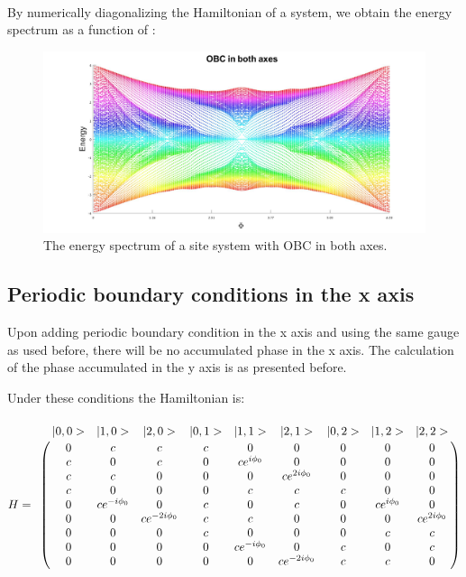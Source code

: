 \documentclass[11pt,fleqn]{article}
\begin{document}
\paragraph{}
By numerically diagonalizing the Hamiltonian of a \endmath \space system, we obtain the energy spectrum as a function of \math{\Phi} \endmath:




\begin{figure}[htp!]
\centerline
    {\includegraphics[scale=0.25]{OBCinbothaxes15sites.jpg}}
    \caption{The energy spectrum of a \endmath\space site system with OBC in both axes.}
\end{figure}
 







\subsection{Periodic boundary conditions in the x axis}
Upon adding periodic boundary condition in the x axis and using the same gauge as used before, there will be no accumulated phase in the x axis. The calculation of the phase accumulated in the y axis is as presented before.

Under these conditions the Hamiltonian is:
\paragraph{}
$$
H = \bordermatrix {
&|0,0>&|1,0>&|2,0>&|0,1>&|1,1>&|2,1>&|0,2>&|1,2>&|2,2>\cr
 &0&c&c&c&0&0&0&0&0\cr
 &c&0&c&0&ce^{i\phi_0}&0&0&0&0\cr
 &c&c&0&0&0&ce^{2i\phi_0}&0&0&0\cr
 &c&0&0&0&c&c&c&0&0\cr
 &0&ce^{-i\phi_0}&0&c&0&c&0&ce^{i\phi_0}&0\cr
 &0&0&ce^{-2i\phi_0}&c&c&0&0&0&ce^{2i\phi_0}\cr
 &0&0&0&c&0&0&0&c&c\cr
 &0&0&0&0&ce^{-i\phi_0}&0&c&0&c\cr
 &0&0&0&0&0&ce^{-2i\phi_0}&c&c&0
}
$$
\end{document}
